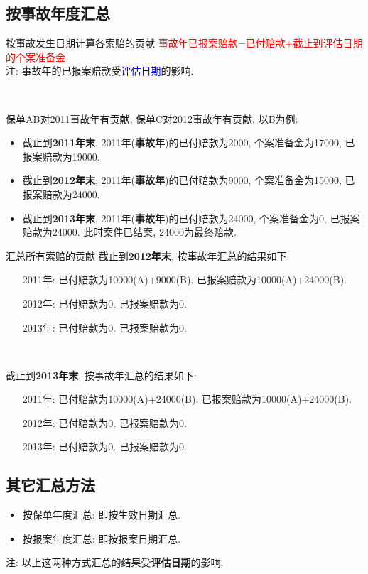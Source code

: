 \documentclass[professionalfont]{beamer}
\newcommand{\red}[1]{\textcolor{red}{#1}}
\newcommand{\green}[1]{\textbf{#1}}
\newcommand{\blue}[1]{\textcolor{blue}{#1}}
\begin{document}
\subsection{{按事故年度汇总}}
\begin{frame}{按事故发生日期计算各索赔的贡献}
	\red{事故年已报案赔款=已付赔款+截止到评估日期的个案准备金}\\
	注: 事故年的已报案赔款受\blue{评估日期}的影响.
	
	~
	
	保单AB对2011事故年有贡献, 保单C对2012事故年有贡献. 以B为例: 
	\begin{itemize}
		\item 截止到\green{2011年末}, 2011年(\green{事故年})的已付赔款为2000, 个案准备金为17000, 已报案赔款为19000. 
		\item 截止到\green{2012年末}, 2011年(\green{事故年})的已付赔款为9000, 个案准备金为15000, 已报案赔款为24000. 
		\item 截止到\green{2013年末}, 2011年(\green{事故年})的已付赔款为24000, 个案准备金为0, 已报案赔款为24000.	此时案件已结案, 24000为最终赔款.
	\end{itemize}	
\end{frame}
\begin{frame}{汇总所有索赔的贡献}
截止到\green{2012年末}, 按事故年汇总的结果如下:
\begin{itemize}
	\item[2011年:]已付赔款为10000(A)+9000(B). 已报案赔款为10000(A)+24000(B). 
	\item[2012年:]已付赔款为0. 已报案赔款为0.\\
	\item[2013年:]已付赔款为0. 已报案赔款为0.
\end{itemize}	

~

截止到\green{2013年末}, 按事故年汇总的结果如下:
\begin{itemize}
	\item[2011年:]已付赔款为10000(A)+24000(B). 已报案赔款为10000(A)+24000(B). 
	\item[2012年:]已付赔款为0. 已报案赔款为0.\\
	\item[2013年:]已付赔款为0. 已报案赔款为0.
\end{itemize}
\end{frame}

\subsection{其它汇总方法}
\begin{frame}
	\begin{itemize}
		\item 按保单年度汇总: 即按生效日期汇总.
		\item 按报案年度汇总: 即按报案日期汇总.
	\end{itemize}
	注: 以上这两种方式汇总的结果受\green{评估日期}的影响.
\end{frame}
\end{document}
